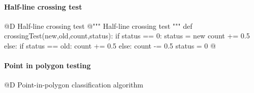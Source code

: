 \documentclass[11pt,oneside]{article}	%
\begin{document}
\paragraph{Half-line crossing test}
@D Half-line crossing test 
@{""" Half-line crossing test """
def crossingTest(new,old,count,status):
    if status == 0:
        status = new
        count += 0.5
    else:
        if status == old: count += 0.5
        else: count -= 0.5
        status = 0
@}

\paragraph{Point in polygon testing}
@D Point-in-polygon classification algorithm
\end{document}
